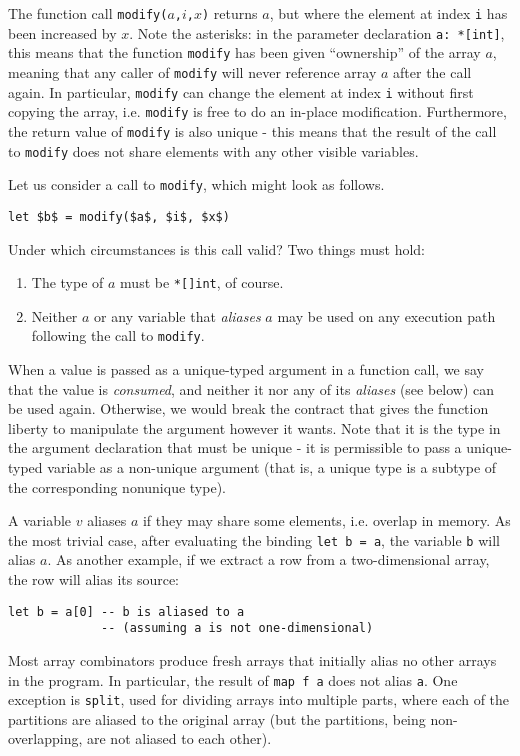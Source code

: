 \documentclass[11pt]{book}
\begin{document}
The function call \texttt{modify($a$,$i$,$x$)} returns $a$, but where
the element at index \texttt{i} has been increased by $x$.  Note the
asterisks: in the parameter declaration \texttt{a: *[int]}, this means
that the function \texttt{modify} has been given ``ownership'' of the
array $a$, meaning that any caller of \texttt{modify} will never
reference array $a$ after the call again.  In particular,
\texttt{modify} can change the element at index \texttt{i} without
first copying the array, i.e. \texttt{modify} is free to do an
in-place modification.  Furthermore, the return value of
\texttt{modify} is also unique - this means that the result of the
call to \texttt{modify} does not share elements with any other visible
variables.

Let us consider a call to \texttt{modify}, which might look as
follows.

\begin{lstlisting}[mathescape=true]
let $b$ = modify($a$, $i$, $x$)
\end{lstlisting}

Under which circumstances is this call valid?  Two things must hold:
\begin{enumerate}
\item The type of \texttt{$a$} must be \texttt{*[]int}, of course.

\item Neither \texttt{$a$} or any variable that \textit{aliases}
  \texttt{$a$} may be used on any execution path following the call to
  \texttt{modify}.
\end{enumerate}

When a value is passed as a unique-typed argument in a function call,
we say that the value is \textit{consumed}, and neither it nor any of
its \textit{aliases} (see below) can be used again.  Otherwise, we
would break the contract that gives the function liberty to manipulate
the argument however it wants.  Note that it is the type in the
argument declaration that must be unique - it is permissible to pass a
unique-typed variable as a non-unique argument (that is, a unique type
is a subtype of the corresponding nonunique type).

A variable $v$ aliases $a$ if they may share some elements,
i.e. overlap in memory.  As the most trivial case, after evaluating
the binding \texttt{let b = a}, the variable \texttt{b} will alias
\texttt{$a$}.  As another example, if we extract a row from a
two-dimensional array, the row will alias its source:
\begin{lstlisting}
let b = a[0] -- b is aliased to a
             -- (assuming a is not one-dimensional)
\end{lstlisting}
Most array combinators produce fresh arrays that initially alias no
other arrays in the program.  In particular, the result of \texttt{map
  f a} does not alias \texttt{a}.  One exception is \texttt{split},
used for dividing arrays into multiple parts, where each of the
partitions are aliased to the original array (but the partitions,
being non-overlapping, are not aliased to each other).
\end{document}
